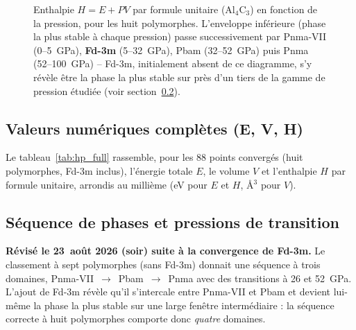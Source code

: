 \documentclass[11pt,a4paper]{article}
\begin{document}
\begin{figure}[h]
\centering
{}
\caption{Enthalpie $H = E + PV$ par formule unitaire (Al$_4$C$_3$) en fonction de la pression,
pour les huit polymorphes. L'enveloppe inférieure (phase la plus stable à chaque pression) passe
successivement par Pnma-VII (0--5~GPa), \textbf{Fd-3m} (5--32~GPa), Pbam (32--52~GPa) puis Pnma
(52--100~GPa) -- Fd-3m, initialement absent de ce diagramme, s'y révèle être la phase la plus
stable sur près d'un tiers de la gamme de pression étudiée (voir section~\ref{sec:sequence}).}
\label{fig:hp}
\end{figure}

\subsection{Valeurs numériques complètes (E, V, H)}

Le tableau~\ref{tab:hp_full} rassemble, pour les 88 points convergés (huit polymorphes, Fd-3m
inclus), l'énergie totale $E$, le
volume $V$ et l'enthalpie $H$ par formule unitaire, arrondis au millième (eV pour $E$ et $H$,
\AA$^3$ pour $V$).



\subsection{Séquence de phases et pressions de transition}
\label{sec:sequence}

\textbf{Révisé le 23~août 2026 (soir) suite à la convergence de Fd-3m.} Le classement à sept
polymorphes (sans Fd-3m) donnait une séquence à trois domaines, Pnma-VII~$\to$~Pbam~$\to$~Pnma
avec des transitions à 26 et 52~GPa. L'ajout de Fd-3m révèle qu'il s'intercale entre Pnma-VII et
Pbam et devient lui-même la phase la plus stable sur une large fenêtre intermédiaire : la
séquence correcte à huit polymorphes comporte donc \emph{quatre} domaines.
\end{document}
